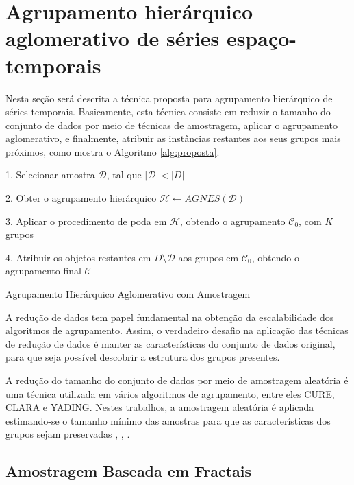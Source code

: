 \section{Agrupamento hierárquico aglomerativo de séries es\-paço-temporais}
	\label{sec:agrupamento_hierarquico}

Nesta seção será descrita a técnica proposta para agrupamento hierárquico de
séries-temporais. Basicamente, esta técnica consiste em reduzir o tamanho do
conjunto de dados por meio de técnicas de amostragem, aplicar o agrupamento
aglomerativo, e finalmente, atribuir as instâncias restantes aos seus grupos
mais próximos, como mostra o Algoritmo \ref{alg:proposta}.

\begin{algorithm}
	1. Selecionar amostra $\mathcal{D}$,
		tal que $\left|\mathcal{D}\right| < \left|D\right|$ \;
		
	2. Obter o agrupamento hierárquico
		$\mathcal{H} \gets AGNES\left(\mathcal{D}\right)$ \;
		
	3. Aplicar o procedimento de poda em $\mathcal{H}$, obtendo
		o agrupamento $\mathcal{C}_0$, com $K$ grupos \;
		
	4. Atribuir os objetos restantes em $D \setminus \mathcal{D}$
		aos grupos em $\mathcal{C}_0$, obtendo o agrupamento final $\mathcal{C}$ \;
	
	\caption{Agrupamento Hierárquico Aglomerativo com Amostragem}
	\label{alg:proposta}
\end{algorithm}

A redução de dados tem papel fundamental na obtenção da escalabilidade dos
algoritmos de agrupamento. Assim, o verdadeiro desafio na aplicação das técnicas
de redução de dados é manter as características do conjunto de dados original,
para que seja possível descobrir a estrutura dos grupos presentes.

A redução do tamanho do conjunto de dados por meio de amostragem aleatória é uma
técnica utilizada em vários algoritmos de agrupamento, entre eles CURE, CLARA e
YADING. Nestes trabalhos, a amostragem aleatória é aplicada estimando-se o
tamanho mínimo das amostras para que as características dos grupos sejam
preservadas \cite{guha1998cure}, \cite{kaufman1990finding}, \cite{Ding2015}.

\subsection{Amostragem Baseada em Fractais}
	\label{subsec:reducao_fractais}

